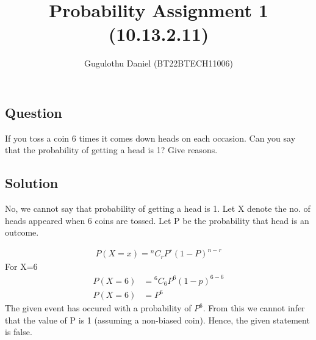 \documentclass[12pt,twocolumn,notitlepage]{article}
\title{Probability Assignment 1 (10.13.2.11)}
\author{Gugulothu Daniel (BT22BTECH11006)}
\date{}
\newcommand*{\comb}[2]{{}^{#1}C_{#2}}
\begin{document}
	
	\maketitle
	\subsection*{Question}
   If you toss a coin 6 times it comes down heads on each occasion. Can you say that the probability of getting a head is 1? Give reasons.
	
	
	\subsection*{Solution}
	
	No, we cannot say that probability of getting a head is 1.
	Let X denote the no. of heads appeared when 6 coins are tossed.
	Let P be the probability that head is an outcome.
	
	
	\begin{align}
		P(X=x) = \comb{n}{r}P^r (1-P)^{n-r}
	\end{align}
For X=6
	\begin{align}
		P(X=6) &= \comb{6}{6}P^6 (1-p)^{6-6} \\
		P(X=6) &= P^6
	\end{align}
The given event has occured with a probability of $P^{6}$. From this we cannot infer that the value of P is 1 (assuming a non-biased coin). 
Hence, the given statement is false.
\end{document}
